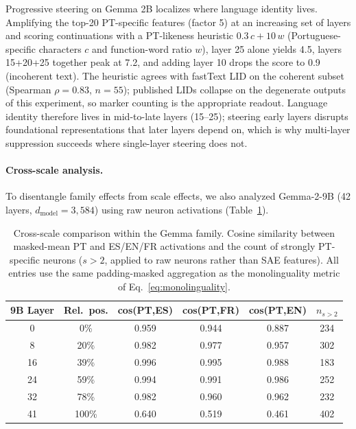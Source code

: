 \documentclass[runningheads]{llncs}
\begin{document}
Progressive steering on Gemma 2B localizes where language identity lives. Amplifying the top-20 PT-specific features (factor 5) at an increasing set of layers and scoring continuations with a PT-likeness heuristic $0.3\,c + 10\,w$ (Portuguese-specific characters $c$ and function-word ratio $w$), layer 25 alone yields 4.5, layers 15+20+25 together peak at 7.2, and adding layer 10 drops the score to 0.9 (incoherent text). The heuristic agrees with fastText LID on the coherent subset (Spearman $\rho = 0.83$, $n=55$); published LIDs collapse on the degenerate outputs of this experiment, so marker counting is the appropriate readout. Language identity therefore lives in mid-to-late layers (15--25); steering early layers disrupts foundational representations that later layers depend on, which is why multi-layer suppression succeeds where single-layer steering does not.

\paragraph{Cross-scale analysis.}
\label{sec:crossscale}

To disentangle family effects from scale effects, we also analyzed Gemma-2-9B (42 layers, $d_\text{model}=3{,}584$) using raw neuron activations (Table~\ref{tab:crossscale}).

\begin{table}[t]
\centering
\caption{Cross-scale comparison within the Gemma family. Cosine similarity between masked-mean PT and ES/EN/FR activations and the count of strongly PT-specific neurons ($s > 2$, applied to raw neurons rather than SAE features). All entries use the same padding-masked aggregation as the monolinguality metric of Eq.~\ref{eq:monolinguality}.}
\label{tab:crossscale}
\begin{tabular}{cccccc}
\toprule
\textbf{9B Layer} & \textbf{Rel.\ pos.} & \textbf{cos(PT,ES)} & \textbf{cos(PT,FR)} & \textbf{cos(PT,EN)} & \textbf{$n_{s>2}$} \\
\midrule
0  & 0\%  & 0.959 & 0.944 & 0.887 & 234 \\
8  & 20\% & 0.982 & 0.977 & 0.957 & 302 \\
16 & 39\% & 0.996 & 0.995 & 0.988 & 183 \\
24 & 59\% & 0.994 & 0.991 & 0.986 & 252 \\
32 & 78\% & 0.982 & 0.960 & 0.962 & 232 \\
41 & 100\% & 0.640 & 0.519 & 0.461 & 402 \\
\bottomrule
\end{tabular}
\end{table}
\end{document}
